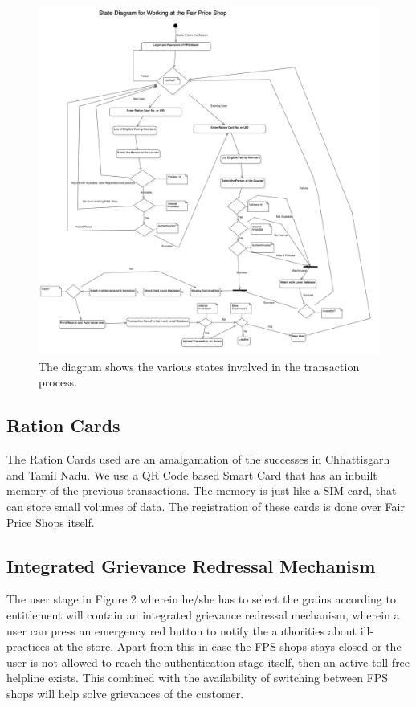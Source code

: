 \documentclass[a4paper,12pt]{extarticle}
\begin{document}
\begin{figure}
\centering
\includegraphics[width=1.1\textwidth]{FPS.jpg}
\caption{\label{fig:design}The diagram shows the various states  involved in the transaction process.}
\end{figure}

\subsection{Ration Cards}
The Ration Cards used are an amalgamation of the successes in Chhattisgarh and Tamil Nadu. We use a QR Code based Smart Card that has an inbuilt memory of the previous transactions. The memory is just like a SIM card, that can store small volumes of data. The registration of these cards is done over Fair Price Shops itself.

\subsection{Integrated Grievance Redressal Mechanism}
The user stage in Figure 2 wherein he/she has to select the grains according to entitlement will contain an integrated grievance redressal mechanism, wherein a user can press an emergency red button to notify the authorities about ill-practices at the store.
Apart from this in case the FPS shops stays closed or the user is not allowed to reach the authentication stage itself, then an active toll-free helpline exists. 
This combined with the availability of switching between FPS shops will help solve grievances of the customer.
\end{document}
